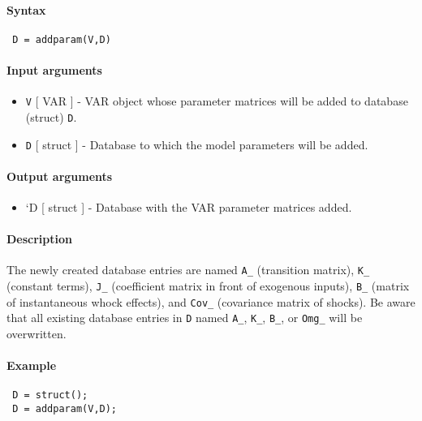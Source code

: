 


	\paragraph{Syntax}
 
 \begin{verbatim}
 D = addparam(V,D)
 \end{verbatim}
 
 \paragraph{Input arguments}
 
 \begin{itemize}
 \item
   \texttt{V} {[} VAR {]} - VAR object whose parameter matrices will be
   added to database (struct) \texttt{D}.
 \item
   \texttt{D} {[} struct {]} - Database to which the model parameters
   will be added.
 \end{itemize}
 
 \paragraph{Output arguments}
 
 \begin{itemize}
 \item
   `D {[} struct {]} - Database with the VAR parameter matrices added.
 \end{itemize}
 
 \paragraph{Description}
 
 The newly created database entries are named \texttt{A\_} (transition
 matrix), \texttt{K\_} (constant terms), \texttt{J\_} (coefficient matrix
 in front of exogenous inputs), \texttt{B\_} (matrix of instantaneous
 whock effects), and \texttt{Cov\_} (covariance matrix of shocks). Be
 aware that all existing database entries in \texttt{D} named
 \texttt{A\_}, \texttt{K\_}, \texttt{B\_}, or \texttt{Omg\_} will be
 overwritten.
 
 \paragraph{Example}
 
 \begin{verbatim}
 D = struct();
 D = addparam(V,D);
 \end{verbatim}


